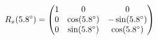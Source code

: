 \documentclass[preview]{standalone}
\begin{document}
\begin{align*}
\special{dvisvgm:raw <g id='unique000'>}R_x(5.8^\circ) = \begin{pmatrix} 1 & 0 & 0 \\ 0 & \cos(5.8^\circ) & -\sin(5.8^\circ) \\ 0 & \sin(5.8^\circ) & \cos(5.8^\circ) \end{pmatrix}\special{dvisvgm:raw </g>}
\end{align*}
\end{document}
